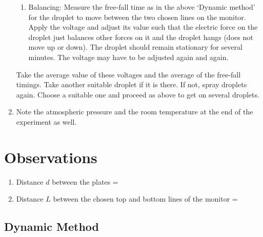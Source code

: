 \documentclass[%
sor,
 jor,
 amsmath,amssymb,
 reprint,%
]{revtex4-2}
\begin{document}
\begin{enumerate}
\begin{enumerate}
        \item {Balancing:} Measure the free-fall time as in the above ‘Dynamic method’ for the droplet to move between the two chosen lines on the monitor. Apply the voltage and adjust its value such that the electric force on the droplet just balances other forces on it and the droplet hangs (does not move up or down). The droplet should remain stationary for several minutes. The voltage may have to be adjusted again and again.
    \end{enumerate}
    Take the {average value} of these voltages and the {average of the free-fall timings.} Take another suitable droplet if it is there. If not, spray droplets again. Choose a suitable one and proceed as above to get on several droplets.
    \item Note the atmospheric pressure and the room temperature at the end of the experiment as well.
\end{enumerate}


\section{Observations}
\begin{enumerate}
  \item Distance $d$ between the plates = 
  \item Distance $L$ between the chosen top and bottom lines of the monitor = \uline{$ $}
\end{enumerate}

\subsection{Dynamic Method}
\end{document}
